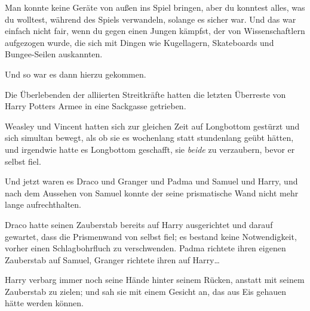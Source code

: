 Man konnte keine Geräte von außen ins Spiel bringen, aber du konntest alles, was du wolltest, während des Spiels verwandeln, solange es sicher war. Und das war einfach nicht fair, wenn du gegen einen Jungen kämpfst, der von Wissenschaftlern aufgezogen wurde, die sich mit Dingen wie Kugellagern, Skateboards und Bungee-Seilen auskannten.

Und so war es dann hierzu gekommen.

Die Überlebenden der alliierten Streitkräfte hatten die letzten Überreste von Harry Potters Armee in eine Sackgasse getrieben.

Weasley und Vincent hatten sich zur gleichen Zeit auf Longbottom gestürzt und sich simultan bewegt, als ob sie es wochenlang statt stundenlang geübt hätten, und irgendwie hatte es Longbottom geschafft, sie \emph{beide} zu verzaubern, bevor er selbst fiel.

Und jetzt waren es Draco und Granger und Padma und Samuel und Harry, und nach dem Aussehen von Samuel konnte der seine prismatische Wand nicht mehr lange aufrechthalten.

Draco hatte seinen Zauberstab bereits auf Harry ausgerichtet und darauf gewartet, dass die Prismenwand von selbst fiel; es bestand keine Notwendigkeit, vorher einen Schlagbohrfluch zu verschwenden. Padma richtete ihren eigenen Zauberstab auf Samuel, Granger richtete ihren auf Harry…

Harry verbarg immer noch seine Hände hinter seinem Rücken, anstatt mit seinem Zauberstab zu zielen; und sah sie mit einem Gesicht an, das aus Eis gehauen hätte werden können.

